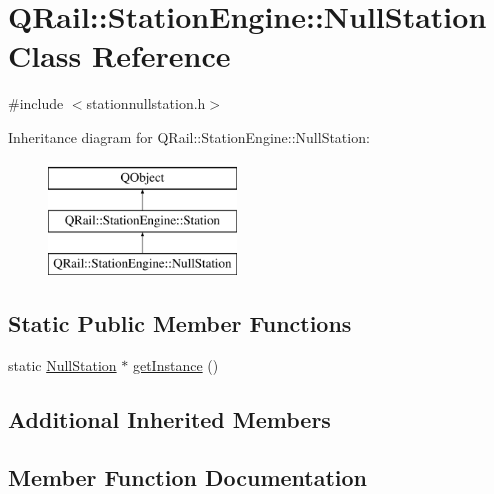 \hypertarget{classQRail_1_1StationEngine_1_1NullStation}{}\section{Q\+Rail\+::Station\+Engine\+::Null\+Station Class Reference}
\label{classQRail_1_1StationEngine_1_1NullStation}


{\ttfamily \#include $<$stationnullstation.\+h$>$}

Inheritance diagram for Q\+Rail\+::Station\+Engine\+::Null\+Station\+:\begin{figure}[H]
\begin{center}
\leavevmode
\includegraphics[height=3.000000cm]{classQRail_1_1StationEngine_1_1NullStation}
\end{center}
\end{figure}
\subsection*{Static Public Member Functions}
\begin{DoxyCompactItemize}
\item 
static \mbox{\hyperlink{classQRail_1_1StationEngine_1_1NullStation}{Null\+Station}} $\ast$ \mbox{\hyperlink{classQRail_1_1StationEngine_1_1NullStation_a620d1cc84bf91ad1c2cadf1f810c9832}{get\+Instance}} ()
\end{DoxyCompactItemize}
\subsection*{Additional Inherited Members}


\subsection{Member Function Documentation}
\mbox{\label{classQRail_1_1StationEngine_1_1NullStation_a620d1cc84bf91ad1c2cadf1f810c9832}} 
